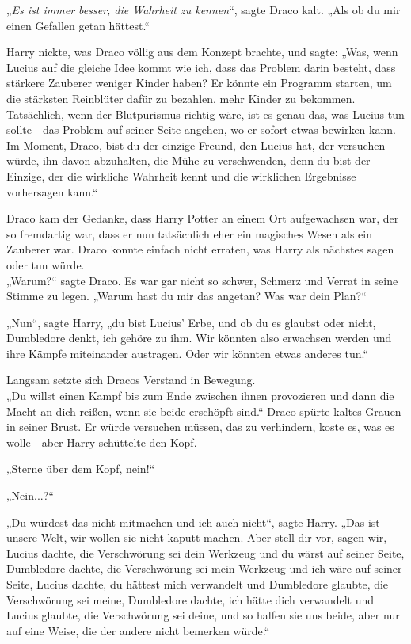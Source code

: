 {„\emph{Es ist immer besser, die Wahrheit zu kennen}“, sagte Draco kalt. „Als ob du mir einen Gefallen getan hättest.“

Harry nickte, was Draco völlig aus dem Konzept brachte, und sagte: „Was, wenn Lucius auf die gleiche Idee kommt wie ich, dass das Problem darin besteht, dass stärkere Zauberer weniger Kinder haben? Er könnte ein Programm starten, um die stärksten Reinblüter dafür zu bezahlen, mehr Kinder zu bekommen. Tatsächlich, wenn der Blutpurismus richtig wäre, ist es genau das, was Lucius tun sollte - das Problem auf seiner Seite angehen, wo er sofort etwas bewirken kann. Im Moment, Draco, bist du der einzige Freund, den Lucius hat, der versuchen würde, ihn davon abzuhalten, die Mühe zu verschwenden, denn du bist der Einzige, der die wirkliche Wahrheit kennt und die wirklichen Ergebnisse vorhersagen kann.“

Draco kam der Gedanke, dass Harry Potter an einem Ort aufgewachsen war, der so fremdartig war, dass er nun tatsächlich eher ein magisches Wesen als ein Zauberer war. Draco konnte einfach nicht erraten, was Harry als nächstes sagen oder tun würde.\\ „Warum?“ sagte Draco. Es war gar nicht so schwer, Schmerz und Verrat in seine Stimme zu legen. „Warum hast du mir das angetan? Was war dein Plan?“

„Nun“, sagte Harry, „du bist Lucius' Erbe, und ob du es glaubst oder nicht, Dumbledore denkt, ich gehöre zu ihm. Wir könnten also erwachsen werden und ihre Kämpfe miteinander austragen. Oder wir könnten etwas anderes tun.“

Langsam setzte sich Dracos Verstand in Bewegung.\\ „Du willst einen Kampf bis zum Ende zwischen ihnen provozieren und dann die Macht an dich reißen, wenn sie beide erschöpft sind.“ Draco spürte kaltes Grauen in seiner Brust. Er würde versuchen müssen, das zu verhindern, koste es, was es wolle - aber Harry schüttelte den Kopf.

„Sterne über dem Kopf, nein!“

„Nein...?“

„Du würdest das nicht mitmachen und ich auch nicht“, sagte Harry. „Das ist unsere Welt, wir wollen sie nicht kaputt machen. Aber stell dir vor, sagen wir, Lucius dachte, die Verschwörung sei dein Werkzeug und du wärst auf seiner Seite, Dumbledore dachte, die Verschwörung sei mein Werkzeug und ich wäre auf seiner Seite, Lucius dachte, du hättest mich verwandelt und Dumbledore glaubte, die Verschwörung sei meine, Dumbledore dachte, ich hätte dich verwandelt und Lucius glaubte, die Verschwörung sei deine, und so halfen sie uns beide, aber nur auf eine Weise, die der andere nicht bemerken würde.“

}
